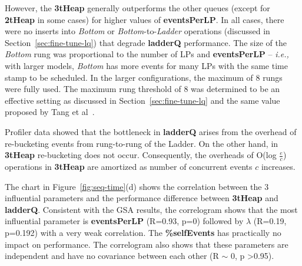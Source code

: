 However, the \textbf{3tHeap} generally outperforms the other queues (except for \textbf{2tHeap} in some cases) for higher values of \textbf{events\-Per\-LP}. In all cases, there were no inserts into \emph{Bottom} or \emph{Bottom}-to-\emph{Ladder} operations (discussed in Section~\ref{sec:fine-tune-lq}) that degrade \textbf{ladderQ} performance. The size of the \emph{Bottom} rung was proportional to the number of LPs and \textbf{eventsPerLP} -- \textit{i.e.,} with larger models, \emph{Bottom} has more events for many LPs with the same time stamp to be scheduled. In the larger configurations, the maximum of 8 rungs were fully used. The maximum rung threshold of 8 was determined to be an effective setting as discussed in Section~\ref{sec:fine-tune-lq} and the same value proposed by Tang et al~\cite{tang-05}.

Profiler data showed that the bottleneck in \textbf{ladderQ} arises from the overhead of re-bucketing events from rung-to-rung of the Ladder. On the other hand, in \textbf{3tHeap} re-bucketing does not occur. Consequently, the overheads of O(log $\frac{e}{c}$) operations in \textbf{3tHeap} are amortized as number of concurrent events $c$ increases.

The chart in Figure~\ref{fig:seq-time}(d) shows the correlation between the 3 influential parameters and the performance difference between \textbf{3tHeap} and \textbf{ladderQ}. Consistent with the GSA results, the correlogram shows that the most influential parameter is \textbf{eventsPerLP} (R=0.93, p=0) followed by $\lambda$ (R=0.19, p=0.192) with a very weak correlation. The \textbf{\%selfEvents} has practically no impact on performance. The correlogram also shows that these parameters are independent and have no covariance between each other
(R $\sim$ 0, p \textgreater 0.95).

